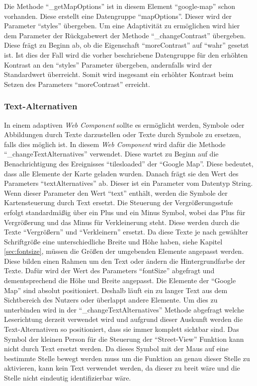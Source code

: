 \documentclass[12pt, paper=a4, bibtotoc, toc=listof, headsepline=true]{scrreprt}
\begin{document}
	Die Methode \enquote{\_getMapOptions} ist in diesem Element \enquote{google-map} schon vorhanden. Diese erstellt eine Datengruppe \enquote{mapOptions}. Dieser wird der Parameter \enquote{styles} übergeben. Um eine Adaptivität zu ermöglichen wird hier dem Parameter der Rückgabewert der Methode \enquote{\_changeContrast} übergeben. Diese frägt zu Beginn ab, ob die Eigenschaft \enquote{moreContrast} auf \enquote{wahr} gesetzt ist. Ist dies der Fall wird die vorher beschriebene Datengruppe für den erhöhten Kontrast an den \enquote{styles} Parameter übergeben, andernfalls wird der Standardwert überreicht. Somit wird insgesamt ein erhöhter Kontrast beim Setzen des Parameters \enquote{moreContrast} erreicht.
	\subsubsection{Text-Alternativen}
	In einem adaptiven \emph{Web Component} sollte es ermöglicht werden, Symbole oder Abbildungen durch Texte darzustellen oder Texte durch Symbole zu ersetzen, falls dies möglich ist. In diesem \emph{Web Component} wird dafür die Methode \enquote{\_changeTextAlternatives} verwendet. Diese wartet zu Beginn auf die Benachrichtigung des Ereignisses \enquote{tilesloaded} der \enquote{Google Map}. Diese bedeutet, dass alle Elemente der Karte geladen wurden. Danach frägt sie den Wert des Parameters \enquote{textAlternatives} ab. Dieser ist ein Parameter vom Datentyp String. Wenn dieser Parameter den Wert \enquote{text} enthält, werden die Symbole der Kartensteuerung durch Text ersetzt. Die Steuerung der Vergrößerungsstufe erfolgt standardmäßig über ein Plus und ein Minus Symbol, wobei das Plus für Vergrößerung und das Minus für Verkleinerung steht. Diese werden durch die Texte \enquote{Vergrößern} und \enquote{Verkleinern} ersetzt. Da diese Texte je nach gewählter Schriftgröße eine unterschiedliche Breite und Höhe haben, siehe Kapitel
	\ref{sec:fontsize}, müssen die Größen der umgebenden Elemente angepasst werden. Diese bilden einen Rahmen um den Text oder ändern die Hintergrundfarbe der Texte. Dafür wird der Wert des Parameters \enquote{fontSize} abgefragt und dementsprechend die Höhe und Breite angepasst. Die Elemente der \enquote{Google Map} sind absolut positioniert. Deshalb läuft ein zu langer Text aus dem Sichtbereich des Nutzers oder überlappt andere Elemente. Um dies zu unterbinden wird in der \enquote{\_changeTextAlternatives} Methode abgefragt welche Leserichtung derzeit verwendet wird und aufgrund dieser Auskunft werden die Text-Alternativen so positioniert, dass sie immer komplett sichtbar sind. Das Symbol der kleinen Person für die Steuerung der \enquote{Street-View} Funktion kann nicht durch Text ersetzt werden. Da dieses Symbol mit der Maus auf eine bestimmte Stelle bewegt werden muss um die Funktion an genau dieser Stelle zu aktivieren, kann kein Text verwendet werden, da dieser zu breit wäre und die Stelle nicht eindeutig identifizierbar wäre. 
\end{document}
